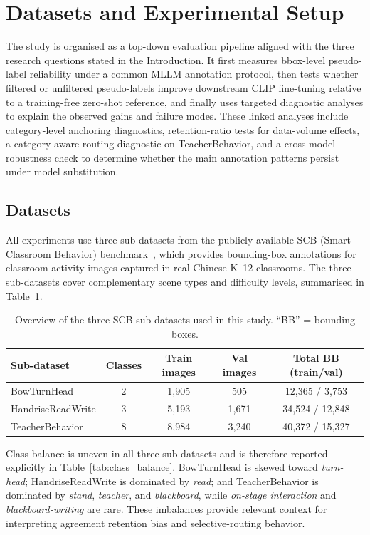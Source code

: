 \documentclass[10pt,letterpaper]{article}
\begin{document}
\section*{Datasets and Experimental Setup}
\label{sec:method}

The study is organised as a top-down evaluation pipeline aligned with
the three research questions stated in the Introduction.
It first measures bbox-level pseudo-label reliability under a common
MLLM annotation protocol, then tests whether filtered or unfiltered
pseudo-labels improve downstream CLIP fine-tuning relative to a
training-free zero-shot reference, and finally uses targeted diagnostic
analyses to explain the observed gains and failure modes.
These linked analyses include category-level anchoring diagnostics,
retention-ratio tests for data-volume effects, a category-aware routing
diagnostic on TeacherBehavior, and a cross-model robustness check to
determine whether the main annotation patterns persist under model
substitution.

\subsection*{Datasets}
\label{sec:datasets}

All experiments use three sub-datasets from the publicly available
SCB (Smart Classroom Behavior) benchmark~\cite{scb_dataset}, which
provides bounding-box annotations for classroom activity images
captured in real Chinese K--12 classrooms.
The three sub-datasets cover complementary scene types and difficulty
levels, summarised in Table~\ref{tab:datasets}.

\begin{table}[H]
\caption{Overview of the three SCB sub-datasets used in this study.
``BB'' = bounding boxes.}
\label{tab:datasets}
\centering
\begin{tabular}{lcccc}
\toprule
\textbf{Sub-dataset} & \textbf{Classes} & \textbf{Train images} &
\textbf{Val images} & \textbf{Total BB (train/val)} \\
\midrule
BowTurnHead       & 2 & 1{,}905 & 505  & 12{,}365 / 3{,}753  \\
HandriseReadWrite & 3 & 5{,}193 & 1{,}671 & 34{,}524 / 12{,}848 \\
TeacherBehavior   & 8 & 8{,}984 & 3{,}240 & 40{,}372 / 15{,}327 \\
\bottomrule
\end{tabular}
\end{table}

Class balance is uneven in all three sub-datasets and is therefore
reported explicitly in Table~\ref{tab:class_balance}.
BowTurnHead is skewed toward \textit{turn-head}; HandriseReadWrite is
dominated by \textit{read}; and TeacherBehavior is dominated by
\textit{stand}, \textit{teacher}, and \textit{blackboard}, while
\textit{on-stage interaction} and \textit{blackboard-writing} are rare.
These imbalances provide relevant context for interpreting agreement
retention bias and selective-routing behavior.
\end{document}
